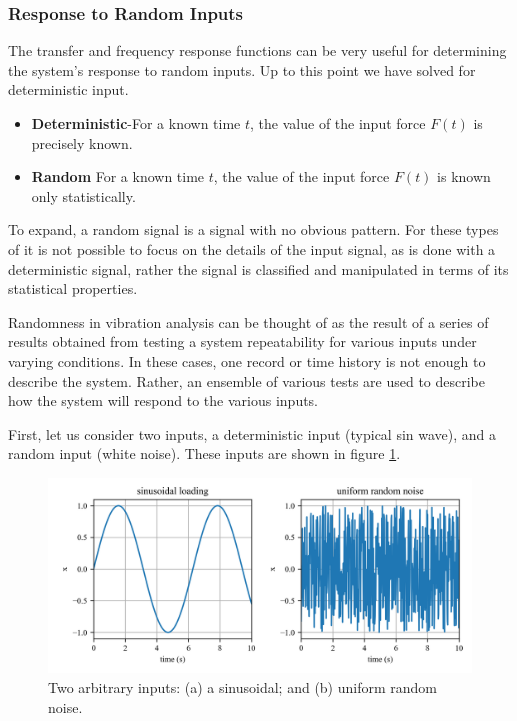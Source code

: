 \documentclass[12pt,letter]{article}
\numberwithin{ex}{section} %
\numberwithin{re}{section} %
\begin{document}
\subsubsection{Response to Random Inputs}
The transfer and frequency response functions can be very useful for determining the system's response to random inputs. Up to this point we have solved for deterministic input. 

\begin{itemize}
\item \textbf{Deterministic}-For a known time $t$, the value of the input force $F(t)$ is precisely known. 
\item \textbf{Random} For a known time $t$, the value of the input force $F(t)$ is known only statistically. 
\end{itemize}

To expand, a random signal is a signal with no obvious pattern. For these types of it is not possible to focus on the details of the input signal, as is done with a deterministic signal, rather the signal is classified and manipulated in terms of its statistical properties. 

Randomness in vibration analysis can be thought of as the result of a series of results obtained from testing a system repeatability for various inputs under varying conditions. In these cases, one record or time history is not enough to describe the system. Rather, an ensemble of various tests are used to describe how the system will respond to the various inputs. 

First, let us consider two inputs, a deterministic input (typical sin wave), and a random input (white noise). These inputs are shown in figure \ref{fig:Response_to_random_input_inputs}. 

\begin{figure}[H]
	\centering
	\includegraphics[width=1\textwidth]{../figures/Response_to_random_input_inputs.png}
	\caption{Two arbitrary inputs: (a) a sinusoidal; and (b) uniform random noise.}
	\label{fig:Response_to_random_input_inputs}
\end{figure}
\end{document}
